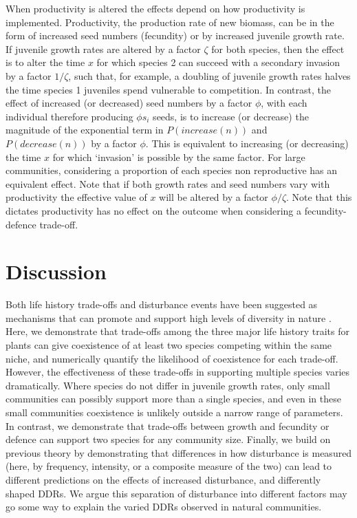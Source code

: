 \documentclass[a4paper]{article}
\begin{document}
When productivity is altered the effects depend on how productivity is implemented. Productivity, the production rate of new biomass, can be in the form of increased seed numbers (fecundity) or by increased juvenile growth rate. If juvenile growth rates are altered by a factor $\zeta$ for both species, then the effect is to alter the time $x$ for which species 2 can succeed with a secondary invasion by a factor $1/\zeta$, such that, for example, a doubling of juvenile growth rates halves the time species 1 juveniles spend vulnerable to competition.  In contrast, the effect of increased (or decreased) seed numbers by a factor $\phi$, with each individual therefore producing $\phi s_i$ seeds, is to increase (or decrease) the magnitude of the exponential term in $P(increase(n))$ and $P(decrease(n))$ by a factor $\phi$. This is equivalent to increasing (or decreasing) the time $x$ for which `invasion' is possible by the same factor. For large communities, considering a proportion of each species non reproductive has an equivalent effect. Note that if both growth rates and seed numbers vary with productivity the effective value of $x$ will be altered by a factor $\phi / \zeta$. Note that this dictates productivity has no effect on the outcome when considering a fecundity-defence trade-off.

\section{Discussion}
Both life history trade-offs and disturbance events have been suggested as mechanisms that can promote and support high levels of diversity in nature \citep[e.g.][]{adler2000space,denslow1987tropical,sousa1984role,turnbull1999seed}. Here, we demonstrate that trade-offs among the three major life history traits for plants can give coexistence of at least two species competing within the same niche, and numerically quantify the likelihood of coexistence for each trade-off. However, the effectiveness of these trade-offs in supporting multiple species varies dramatically. Where species do not differ in juvenile growth rates, only small communities can possibly support more than a single species, and even in these small communities coexistence is unlikely outside a narrow range of parameters. In contrast, we demonstrate that trade-offs between growth and fecundity or defence can support two species for any community size. Finally, we build on previous theory \citep{miller2011frequency} by demonstrating that differences in how disturbance is measured (here, by frequency, intensity, or a composite measure of the two) can lead to different predictions on the effects of increased disturbance, and differently shaped DDRs. We argue this separation of disturbance into different factors may go some way to explain the varied DDRs observed in natural communities.
\end{document}

